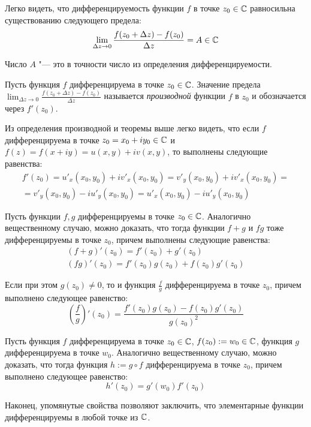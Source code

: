 \begin{note}
	Легко видеть, что дифференцируемость функции $f$ в точке $z_0 \in \mathbb{C}$ равносильна существованию следующего предела:
	\[\lim_{\Delta z \to 0}\frac{f(z_0 + \Delta z) - f(z_0)}{\Delta z} = A \in \mathbb{C}\]
	
	Число $A$ "--- это в точности число из определения дифференцируемости.
\end{note}

\begin{definition}
	Пусть функция $f$ дифференцируема в точке $z_0 \in \mathbb{C}$. Значение предела $\lim_{\Delta z \to 0}\frac{f(z_0 + \Delta z) - f(z_0)}{\Delta z}$ называется \textit{производной} функции $f$ в $z_0$ и обозначается через $f'(z_0)$.
\end{definition}

\begin{note}
	Из определения производной и теоремы выше легко видеть, что если $f$ дифференцируема в точке $z_0 = x_0 + iy_0 \in \mathbb{C}$ и $f(z) = f(x + iy) = u(x, y) + iv(x, y)$, то выполнены следующие равенства:
	\begin{multline*}
		f'(z_0) = u'_x(x_0, y_0) + iv'_x(x_0, y_0) = v'_y(x_0, y_0) + iv'_x(x_0, y_0) =
		\\
		= v'_y(x_0, y_0) - iu'_y(x_0, y_0) = u'_x(x_0, y_0) - iu'_y(x_0, y_0)
	\end{multline*}
\end{note}

\begin{note}
	Пусть функции $f, g$ дифференцируемы в точке $z_0 \in \mathbb{C}$. Аналогично вещественному случаю, можно доказать, что тогда функции $f + g$ и $fg$ тоже дифференцируемы в точке $z_0$, причем выполнены следующие равенства:
	\begin{gather*}
		(f + g)'(z_0) = f'(z_0) + g'(z_0)\\
		(fg)'(z_0) = f'(z_0)g(z_0) + f(z_0)g'(z_0)
	\end{gather*}
	
	Если при этом $g(z_0) \ne 0$, то и функция $\frac fg$ дифференцируема в точке $z_0$, причем выполнено следующее равенство:
	\[
	\left(\frac fg\right)'(z_0) = \frac{f'(z_0)g(z_0) - f(z_0)g'(z_0)}{g(z_0)^2}\]
\end{note}

\begin{note}
	Пусть функция $f$ дифференцируема в точке $z_0 \in \mathbb{C}$, $f(z_0) := w_0 \in \mathbb{C}$, функция $g$ дифференцируема в точке $w_0$. Аналогично вещественному случаю, можно доказать, что тогда функция $h := g \circ f$ дифференцируема в точке $z_0$, причем выполнено следующее равенство:
	\[h'(z_0) = g'(w_0)f'(z_0)\]
	
	Наконец, упомянутые свойства позволяют заключить, что элементарные функции дифференцируемы в любой точке из $\mathbb{C}$.
\end{note}

